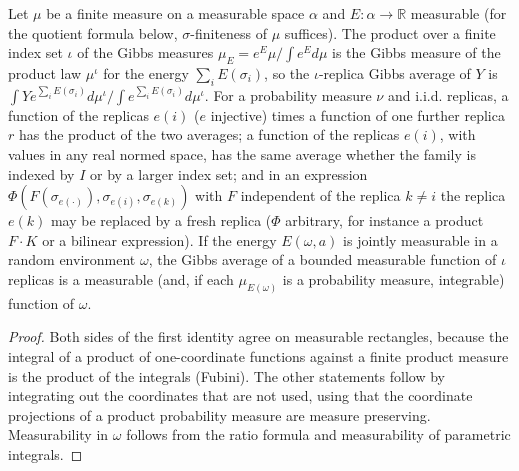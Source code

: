 \begin{lemma}\label{lem:sg-tal:gibbs-replica-product}
\leanok
{}
Let $\mu$ be a finite measure on a measurable space $\alpha$ and $E:\alpha\to\mathbb R$ measurable (for the quotient formula below, $\sigma$-finiteness of $\mu$ suffices). The product over a finite index set $\iota$ of the Gibbs measures $\mu_E=e^{E}\mu/\int e^{E}d\mu$ is the Gibbs measure of the product law $\mu^{\iota}$ for the energy $\sum_{i}E(\sigma_i)$, so the $\iota$-replica Gibbs average of $Y$ is $\int Y e^{\sum_iE(\sigma_i)}d\mu^{\iota}\big/\int e^{\sum_iE(\sigma_i)}d\mu^{\iota}$.
For a probability measure $\nu$ and i.i.d. replicas, a function of the replicas $e(i)$ ($e$ injective) times a function of one further replica $r$ has the product of the two averages; a function of the replicas $e(i)$, with values in any real normed space, has the same average whether the family is indexed by $I$ or by a larger index set; and in an expression $\Phi(F(\sigma_{e(\cdot)}),\sigma_{e(i)},\sigma_{e(k)})$ with $F$ independent of the replica $k\ne i$ the replica $e(k)$ may be replaced by a fresh replica ($\Phi$ arbitrary, for instance a product $F\cdot K$ or a bilinear expression).
If the energy $E(\omega,a)$ is jointly measurable in a random environment $\omega$, the Gibbs average of a bounded measurable function of $\iota$ replicas is a measurable (and, if each $\mu_{E(\omega)}$ is a probability measure, integrable) function of $\omega$.
\end{lemma}
\begin{proof}
\leanok
Both sides of the first identity agree on measurable rectangles, because the integral of a product of one-coordinate functions against a finite product measure is the product of the integrals (Fubini). The other statements follow by integrating out the coordinates that are not used, using that the coordinate projections of a product probability measure are measure preserving.
Measurability in $\omega$ follows from the ratio formula and measurability of parametric integrals.
\end{proof}

